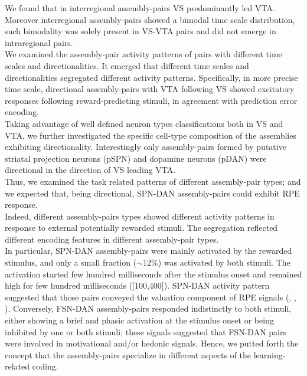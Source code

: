 We found that in interregional assembly-pairs VS predominantly led VTA. Moreover interregional assembly-pairs showed a bimodal time scale distribution, such bimodality was solely present in VS-VTA pairs and did not emerge in intraregional pairs.\\We examined the assembly-pair activity patterns of pairs with different time scales and directionalities. It emerged that different time scales and directionalities segregated different activity patterns. Specifically, in more precise time scale, directional assembly-pairs with VTA following VS showed excitatory responses following reward-predicting stimuli, in agreement with prediction error encoding.\\Taking advantage of well defined neuron types classifications both in VS and VTA, we further investigated the specific cell-type composition of the assemblies exhibiting directionality. Interestingly only assembly-pairs formed by putative striatal projection neurons (pSPN) and dopamine neurons (pDAN) were directional in the direction of VS leading VTA.\\Thus, we examined the task related patterns of different assembly-pair types; and we expected that, being directional, SPN-DAN assembly-pairs could exhibit RPE response.\\Indeed, different assembly-pairs types showed different activity patterns in response to external potentially rewarded stimuli. The segregation reflected different encoding features in different assembly-pair types.\\In particular, SPN-DAN assembly-pairs were mainly activated by the rewarded stimulus, and only a small fraction ($\sim12\%$) was activated by both stimuli. The activation started few hundred milliseconds after the stimulus onset and remained high for few hundred milliseconds ([100,400]). SPN-DAN activity pattern suggested that those pairs conveyed the valuation component of RPE signals (\cite{Tobler2003}, \cite{Nomoto2010}, \cite{Schultz2016}). Conversely, FSN-DAN assembly-pairs responded indistinctly to both stimuli, either showing a brief and phasic activation at the stimulus onset or being inhibited by one or both stimuli; these signals suggested that FSN-DAN pairs were involved in motivational and/or hedonic signals. Hence, we putted forth the concept that the assembly-pairs specialize in different aspects of the learning-related coding.\\%
